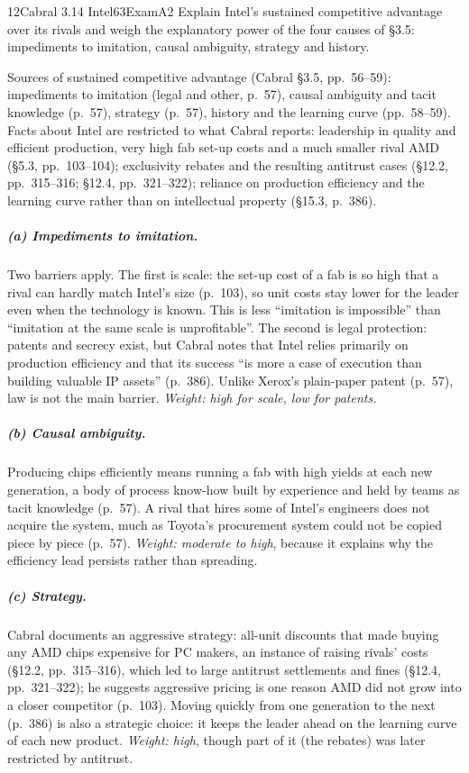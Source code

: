 \begin{exsol}{12}{Cabral 3.14 Intel}{63}{Exam}{A2}
\asked Explain Intel's sustained competitive advantage over its rivals and weigh the
explanatory power of the four causes of \S3.5: impediments to imitation, causal ambiguity,
strategy and history.

\method Sources of sustained competitive advantage (Cabral \S3.5, pp.~56--59): impediments to
imitation (legal and other, p.~57), causal ambiguity and tacit knowledge (p.~57), strategy
(p.~57), history and the learning curve (pp.~58--59). Facts about Intel are restricted to what
Cabral reports: leadership in quality and efficient production, very high fab set-up costs and
a much smaller rival AMD (\S5.3, pp.~103--104); exclusivity rebates and the resulting antitrust
cases (\S12.2, pp.~315--316; \S12.4, pp.~321--322); reliance on production efficiency and the
learning curve rather than on intellectual property (\S15.3, p.~386).

\solution
\subparagraph{(a) Impediments to imitation.} Two barriers apply. The first is scale: the set-up
cost of a fab is so high that a rival can hardly match Intel's size (p.~103), so unit costs stay
lower for the leader even when the technology is known. This is less ``imitation is
impossible'' than ``imitation at the same scale is unprofitable''. The second is legal
protection: patents and secrecy exist, but Cabral notes that Intel relies primarily on production
efficiency and that its success ``is more a case of execution than building valuable IP assets''
(p.~386). Unlike Xerox's plain-paper patent (p.~57),
law is not the main barrier. \emph{Weight: high for scale, low for patents.}

\subparagraph{(b) Causal ambiguity.} Producing chips efficiently means running a fab with high
yields at each new generation, a body of process know-how built by experience and held by teams
as tacit knowledge (p.~57). A rival that hires some of Intel's engineers does not acquire the
system, much as Toyota's procurement system could not be copied piece by piece (p.~57).
\emph{Weight: moderate to high}, because it explains why the efficiency lead persists rather
than spreading.

\subparagraph{(c) Strategy.} Cabral documents an aggressive strategy: all-unit discounts that
made buying any AMD chips expensive for PC makers, an instance of raising rivals' costs (\S12.2,
pp.~315--316), which led to large antitrust settlements and fines (\S12.4, pp.~321--322); he
suggests aggressive pricing is one reason AMD did not grow into a closer competitor (p.~103).
Moving quickly from one generation to the next (p.~386) is also a strategic choice: it keeps the
leader ahead on the learning curve of each new product. \emph{Weight: high}, though part of it
(the rebates) was later restricted by antitrust.


\end{exsol}
